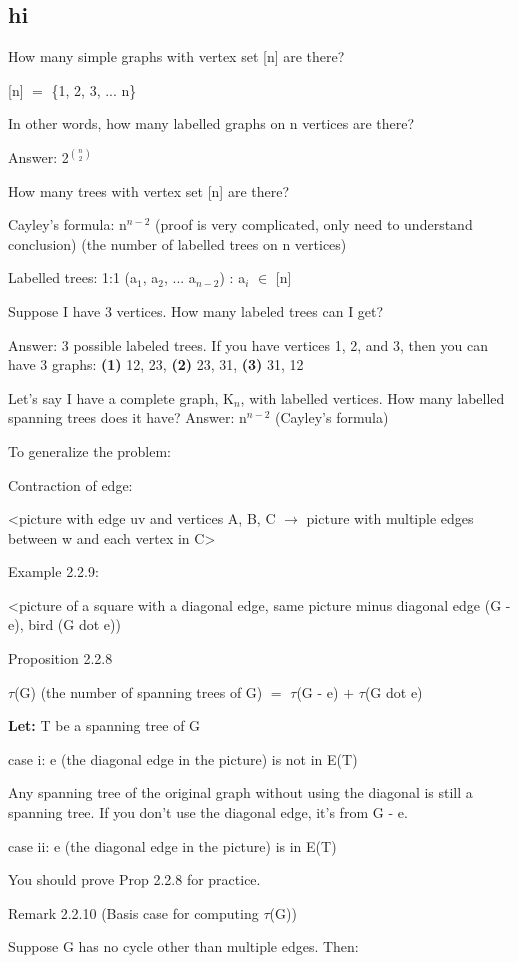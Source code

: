 \documentclass{article}
\newcommand{\mt}[1]{\ensuremath{#1}}
\newcommand\ssc[2][\DefaultOpt]{%
  \def\DefaultOpt{#2}%
  \subsection[#1]{#2}%
}
\newcommand{\lt}[1]{\textbf{Let: } #1}
\newcommand{\bpth}[1]{\textbf{(#1)}}
\newcommand{\mem}{\mt{\in} }
\newcommand{\lra}{ \mt{\longrightarrow} } %
\newcommand{\bk}[1]{\{#1\}}
\newcommand{\ps}{\mt{\operatorname{+}} }
\newcommand{\ms}{\mt{\operatorname{-}} }
\newcommand{\eql}{ \mt{\operatorname{=}} }
\newcommand{\uw}[2]{#1\mt{_{#2}}}
\newcommand{\uf}[2]{#1\mt{^{#2}}}
\newcommand{\nck}[2]{\mt{{#1 \choose #2}}}
\begin{document}
\ssc{hi}{

How many simple graphs with vertex set [n] are there?

[n] \eql \bk{1, 2, 3, ... n}

In other words, how many labelled graphs on n vertices are there?

Answer: \uf{2}{\nck{n}{2}}

How many trees with vertex set [n] are there?

Cayley's formula: \uf{n}{n - 2} (proof is very complicated, only need to understand conclusion) (the number of labelled trees on n vertices)

Labelled trees: 1:1 (\uw{a}{1}, \uw{a}{2}, ... \uw{a}{n - 2}) : \uw{a}{i} \mem [n]

Suppose I have 3 vertices. How many labeled trees can I get?

Answer: 3 possible labeled trees. If you have vertices 1, 2, and 3, then you can have 3 graphs: \bpth{1} 12, 23, \bpth{2} 23, 31, \bpth{3} 31, 12

Let's say I have a complete graph, \uw{K}{n}, with labelled vertices. How many labelled spanning trees does it have? Answer: \uf{n}{n - 2} (Cayley's formula)

To generalize the problem:

Contraction of edge:

<picture with edge uv and vertices A, B, C \lra picture with multiple edges between w and each vertex in C>

Example 2.2.9:

<picture of a square with a diagonal edge, same picture minus diagonal edge (G \ms e), bird (G dot e))

Proposition 2.2.8

$\tau$(G) (the number of spanning trees of G) \eql $\tau$(G \ms e) \ps $\tau$(G dot e)

\lt{T be a spanning tree of G}
 
 case i: e (the diagonal edge in the picture) is not in E(T)
 
 Any spanning tree of the original graph without using the diagonal is still a spanning tree. If you don't use the diagonal edge, it's from G \ms e.
 
 case ii: e (the diagonal edge in the picture) is in E(T)
 
 You should prove Prop 2.2.8 for practice.
 
 Remark 2.2.10 (Basis case for computing $\tau$(G))

Suppose G has no cycle other than multiple edges. Then:

}
\end{document}
